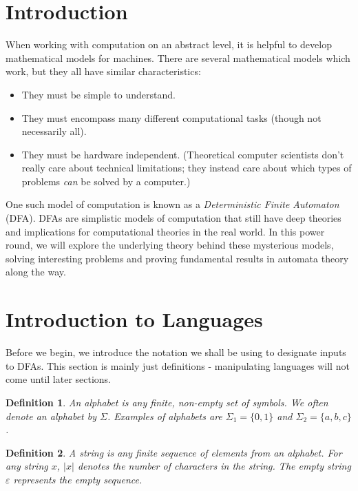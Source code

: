 \documentclass[11pt]{article}
\newtheorem{defn}{Definition}[section]
\begin{document}
\newpage

\section{Introduction}

When working with computation on an abstract level, it is helpful to develop mathematical models for machines.  There are several mathematical models which work, but they all have similar characteristics:

\begin{itemize}

\item They must be simple to understand.

\item They must encompass many different computational tasks (though not necessarily all).

\item They must be hardware independent.  (Theoretical computer scientists don't really care about technical limitations; they instead care about which types of problems \textit{can} be solved by a computer.)

\end{itemize}

One such model of computation is known as a \textit{Deterministic Finite Automaton} (DFA).  DFAs are simplistic models of computation that still have deep theories and implications for computational theories in the real world.  In this power round, we will explore the underlying theory behind these mysterious models, solving interesting problems and proving fundamental results in automata theory along the way.

\section{Introduction to Languages}

Before we begin, we introduce the notation we shall be using to designate inputs to DFAs.  This section is mainly just definitions - manipulating languages will not come until later sections.

\begin{defn} An \emph{alphabet} is any finite, non-empty set of symbols. We often denote an alphabet by $\Sigma$.  Examples of alphabets are $\Sigma_1=\{0,1\}$ and $\Sigma_2=\{a,b,c\}$.\end{defn}

\begin{defn} A \emph{string} is any finite sequence of elements from an alphabet.  For any string $x$, $|x|$ denotes the number of characters in the string.  The empty string $\varepsilon$ represents the empty sequence.\end{defn}
\end{document}
